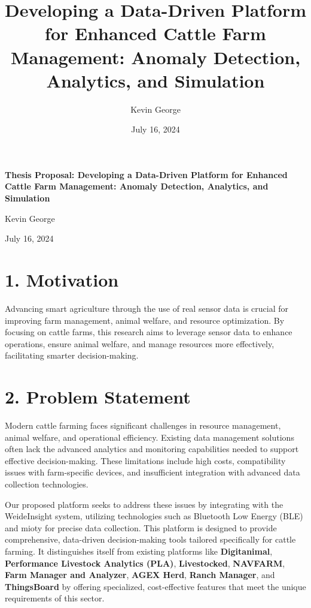 \documentclass[11pt]{article}
\title{Developing a Data-Driven Platform for Enhanced Cattle Farm Management: Anomaly Detection, Analytics, and Simulation}
\author{Kevin George}
\date{July 16, 2024}
\begin{document}
\begin{titlepage}
    \centering
    \vspace*{0.3in}
    \LARGE\textbf{Thesis Proposal: Developing a Data-Driven Platform for Enhanced Cattle Farm Management: Anomaly Detection, Analytics, and Simulation}\par
    \vspace{0.5in}
    \large Kevin George\par
    \vspace{0.2in}
    \normalsize July 16, 2024
    \thispagestyle{empty}
\end{titlepage}

\section*{1. Motivation}
Advancing smart agriculture through the use of real sensor data is crucial for improving farm management, animal welfare, and resource optimization. By focusing on cattle farms, this research aims to leverage sensor data to enhance operations, ensure animal welfare, and manage resources more effectively, facilitating smarter decision-making.


\section*{2. Problem Statement}

Modern cattle farming faces significant challenges in resource management, animal welfare, and operational efficiency. Existing data management solutions often lack the advanced analytics and monitoring capabilities needed to support effective decision-making. These limitations include high costs, compatibility issues with farm-specific devices, and insufficient integration with advanced data collection technologies.

Our proposed platform seeks to address these issues by integrating with the WeideInsight system, utilizing technologies such as Bluetooth Low Energy (BLE) and mioty for precise data collection. This platform is designed to provide comprehensive, data-driven decision-making tools tailored specifically for cattle farming. It distinguishes itself from existing platforms like \textbf{Digitanimal}, \textbf{Performance Livestock Analytics (PLA)}, \textbf{Livestocked}, \textbf{NAVFARM}, \textbf{Farm Manager and Analyzer}, \textbf{AGEX Herd}, \textbf{Ranch Manager}, and \textbf{ThingsBoard} by offering specialized, cost-effective features that meet the unique requirements of this sector.
\end{document}
